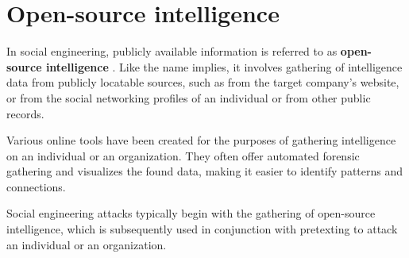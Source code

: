 \section{Open-source intelligence}
\begin{comment}

    - OSINT, sometimes written as OS-INT?
    - Data from publicly available resources
        - Company website
        - Social networking sites
        - Sites like archive.org and Google archives
        - Observing people in real life
    - Does not include calling the company and asking for information or any other forms of engagement
    - How modern AI augments OSINT gathering is analyzed in the last chapter
        - Exploration of how AI tools and techniques used for the automation and enhancement of OSINT processes
    - Stress the importance of OSINT within SE
    - Ethical considerations when it comes to OSINT
    - Some case studies highlighting the use of OSINT in real-world social engineering incidents?
    - Countermeasures will also be covered later
        - Strategies for companies to mitigate the risks associated with OSINT-based attacks
        - Integration of AI algorithms for analyzing and extracting valuable insights from OSINT data
        - Impact of AI-powered intelligence gathering of SE attacks
        
\end{comment}

In social engineering, publicly available information is referred to as \textbf{open-source intelligence} \citep{hadnagySocialEngineering2018}. Like the name implies, it involves gathering of intelligence data from publicly locatable sources, such as from the target company's website, or from the social networking profiles of an individual or from other public records.

Various online tools have been created for the purposes of gathering intelligence on an individual or an organization. They often offer automated forensic gathering and visualizes the found data, making it easier to identify patterns and connections.

Social engineering attacks typically begin with the gathering of open-source intelligence, which is subsequently used in conjunction with pretexting to attack an individual or an organization.












